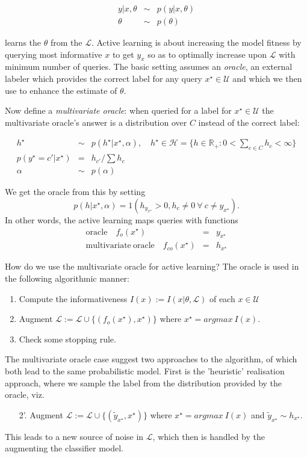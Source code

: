 \documentclass[10pt, onecolumn]{article}
\newcommand{\U}{\mathcal{U}}
\renewcommand{\L}{\mathcal{L}}
\newcommand{\newx}{{x^\star}}
\newcommand{\newy}{y^\star}
\newcommand{\answer}{h^\star}
\renewcommand{\H}{\mathcal{H}}
\newcommand{\R}{\mathbb{R}}
\begin{document}
\begin{eqnarray}
y | x, \theta &\sim & p(y| x, \theta)\\
\theta & \sim & p(\theta)
\end{eqnarray}

learns the $\theta$ from the $\L$. Active learning is about increasing the model fitness  by querying most informative $x$ to get $y_x$ so as to optimally increase upon $\L$ with minimum number of queries. The basic setting assumes an \emph{oracle}, an external labeler which provides the correct label for any query $\newx\in \U$ and which we then use to enhance the estimate of $\theta$.

Now define a \emph{multivariate oracle}: when queried for a label for $\newx\in \U$ the multivariate oracle's answer is a distribution over $C$ instead of the correct label:

\begin{eqnarray}
\answer & \sim & p(\answer | \newx, \alpha), \quad \answer \in \H=\{h\in \R_+: 0<\sum_{c\in C} h_c<\infty\}\\
p(\newy=c' | \newx) &=&h_{c'}/\sum h_{c} \\
\alpha & \sim & p(\alpha)
\end{eqnarray}

We get the oracle from this by setting $$p(h|\newx,\alpha)=1(h_{y_\newx}>0, h_{c}\neq 0\  \forall\ c\neq y_\newx).$$ In other words, the active learning maps queries with functions
\begin{eqnarray}
\mathrm{oracle} \quad f_o(\newx) & = & y_\newx \\
\mathrm{multivariate\ oracle} \quad f_{co}(\newx) & = & h_\newx
\end{eqnarray}

How do we use the multivariate oracle for active learning? The oracle is used in the following algorithmic manner:
\begin{enumerate}
\item Compute the informativeness $I(x):=I(x | \theta, \L)$ of each $x\in \U$
\item Augment $\L:= \L \cup \{(f_o(\newx), \newx)\}$ where $\newx = argmax\ I(x)$.
\item Check some stopping rule.
\end{enumerate}

The multivariate oracle case suggest two approaches to the algorithm, of which both lead to the same probabilistic model. First is the 'heuristic' realisation approach, where we sample the label from the distribution provided by the oracle, viz.
\begin{enumerate}
\item[2'.] Augment $\L:= \L \cup \{(\tilde{y}_\newx, \newx)\}$ where $\newx = argmax\ I(x)$ and $\tilde{y}_\newx\sim h_\newx$.
\end{enumerate}
This leads to a new source of noise in $\L$, which then is handled by the augmenting the classifier model. 
\end{document}
